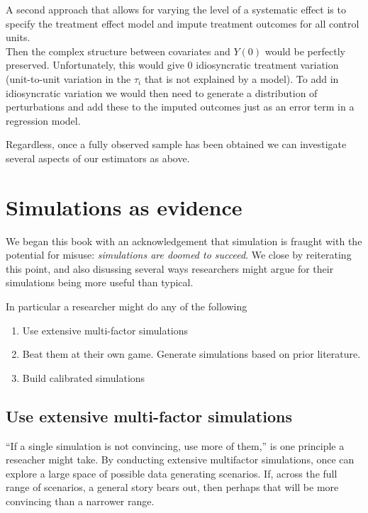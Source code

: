 \documentclass[
]{book}
\providecommand{\tightlist}{%
  \setlength{\itemsep}{0pt}\setlength{\parskip}{0pt}}
\begin{document}
A second approach that allows for varying the level of a systematic effect is to specify the treatment effect model and impute treatment outcomes for all control units.\\
Then the complex structure between covariates and \(Y(0)\) would be perfectly preserved.
Unfortunately, this would give 0 idiosyncratic treatment variation (unit-to-unit variation in the \(\tau_i\) that is not explained by a model).
To add in idiosyncratic variation we would then need to generate a distribution of perturbations and add these to the imputed outcomes just as an error term in a regression model.

Regardless, once a fully observed sample has been obtained we can investigate several aspects of our estimators as above.

\hypertarget{simulations-as-evidence}{%
\chapter{Simulations as evidence}\label{simulations-as-evidence}}

We began this book with an acknowledgement that simulation is fraught with the potential for misuse: \emph{simulations are doomed to succeed}.
We close by reiterating this point, and also disussing several ways researchers might argue for their simulations being more useful than typical.

In particular a researcher might do any of the following

\begin{enumerate}
\def\labelenumi{\arabic{enumi}.}
\tightlist
\item
  Use extensive multi-factor simulations
\item
  Beat them at their own game. Generate simulations based on prior literature.
\item
  Build calibrated simulations
\end{enumerate}

\hypertarget{use-extensive-multi-factor-simulations}{%
\section{Use extensive multi-factor simulations}\label{use-extensive-multi-factor-simulations}}

``If a single simulation is not convincing, use more of them,'' is one principle a reseacher might take.
By conducting extensive multifactor simulations, once can explore a large space of possible data generating scenarios.
If, across the full range of scenarios, a general story bears out, then perhaps that will be more convincing than a narrower range.
\end{document}
